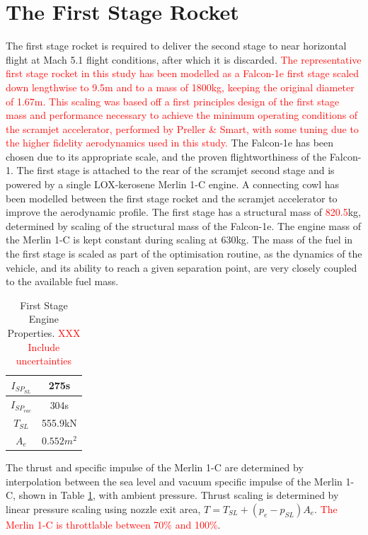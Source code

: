 \section{The First Stage Rocket}\label{sec:firststage}



The first stage rocket is required to deliver the second stage to near horizontal flight at Mach 5.1 flight conditions,
after which it is discarded. 
\textcolor{red}{The representative first stage rocket in this study has been  modelled as a Falcon-1e first stage scaled down
lengthwise to 9.5m and to a mass of 1800kg, keeping the original diameter of 1.67m\cite{Vehicle2008}. This scaling was based off a first principles design of the first stage mass and performance necessary to achieve the minimum operating conditions of the scramjet accelerator, performed by Preller \& Smart\cite{Preller2017b}, with some tuning due to the higher fidelity aerodynamics used in this study.}
The Falcon-1e has been chosen due to its appropriate scale, and the proven flightworthiness of the Falcon-1. 
 The first stage is attached to the rear of the scramjet
second stage and is powered by a single LOX-kerosene Merlin 1-C engine. A connecting cowl has been modelled between the first stage rocket and the scramjet accelerator to improve the aerodynamic profile.  The first stage has a structural mass of
\textcolor{red}{820.5}kg, determined by scaling of the structural mass of the Falcon-1e. The engine mass of the Merlin 1-C is kept constant during scaling at 630kg\cite{Wade2017}. The mass of the
fuel in the first stage is scaled as part of the optimisation routine, as the dynamics of the vehicle, and its ability to reach a
given separation point, are very closely coupled to the available fuel mass.

\begin{table}[!h]
	\centering
	\begin{tabular}{|c|c|}
		\hline  $I_{SP_{SL}}$ & 275s \\ 
		\hline  $I_{SP_{vac}}$ & 304s\\ 
		\hline  $T_{SL}$ & 555.9kN \\ 
		\hline  $A_{e}$ & $0.552m^2$ \\ 
		\hline 
	\end{tabular} 
	\caption{First Stage Engine Properties\cite{Wade2017}. \textcolor{red}{XXX Include uncertainties}}
	\label{tab:1stStageEngine}
\end{table}
The thrust and specific impulse of the Merlin 1-C are determined by interpolation between the sea level and vacuum specific impulse of the Merlin 1-C, shown in Table \ref{tab:1stStageEngine}, with ambient pressure. Thrust scaling is determined by linear pressure scaling using nozzle exit area, $T = T_{SL} + (p_e - p_{SL})A_e$. 
 \textcolor{red}{The Merlin 1-C is throttlable between 70\% and 100\%\cite{Norris2011}}.




